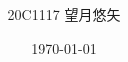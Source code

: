 \documentclass[uplatex, a4paper, 12pt, openany, oneside]{jsbook}
\title{
  \centering
    \scalebox{1.0}{軌道計画と軌道生成}\\
    \vspace{-0.3zh}
    \scalebox{0.6}{Path planning and Trajectory Generation}
    \vspace{-0.6zh}
}
\date{\today}
\author{20C1117 望月悠矢}
\begin{document}
\frontmatter{}
%

%
\mainmatter{}
%


%

\backmatter{}
%

%
\end{document}
